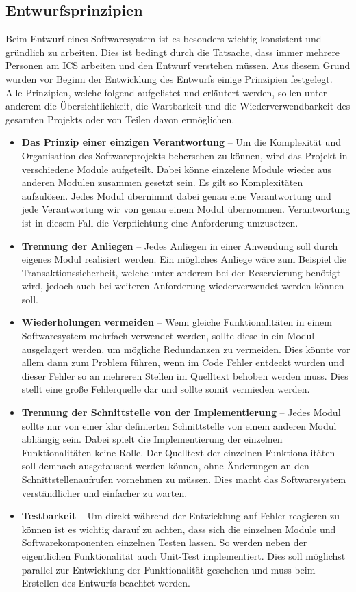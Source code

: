 		\subsection{Entwurfsprinzipien}
		Beim Entwurf eines Softwaresystem ist es besonders wichtig konsistent und gründlich zu arbeiten. Dies ist bedingt durch die Tatsache, dass immer mehrere Personen am \ac{ICS} arbeiten und den Entwurf verstehen müssen. Aus diesem Grund wurden vor Beginn der Entwicklung des Entwurfs einige Prinzipien festgelegt. Alle Prinzipien, welche folgend aufgelistet und erläutert werden, sollen unter anderem die Übersichtlichkeit, die Wartbarkeit und die Wiederverwendbarkeit des gesamten Projekts oder von Teilen davon ermöglichen.
		\begin{itemize}
			\item \textbf{Das Prinzip einer einzigen Verantwortung} -- Um die Komplexität und Organisation des Softwareprojekts beherschen zu können, wird das Projekt in verschiedene Module aufgeteilt. Dabei könne einzelene Module wieder aus anderen Modulen zusammen gesetzt sein. Es gilt so Komplexitäten aufzulösen. Jedes Modul übernimmt dabei genau eine Verantwortung und jede Verantwortung wir von genau einem Modul übernommen. Verantwortung ist in diesem Fall die Verpflichtung eine Anforderung umzusetzen. \autocite[Vgl.][]{Lahres.2015}
			\item \textbf{Trennung der Anliegen} -- Jedes Anliegen in einer Anwendung soll durch eigenes Modul realisiert werden. Ein mögliches Anliege wäre zum Beispiel die Transaktionssicherheit, welche unter anderem bei der Reservierung benötigt wird, jedoch auch bei weiteren Anforderung wiederverwendet werden können soll.\autocite[Vgl.][]{Lahres.2015} 
			\item \textbf{Wiederholungen vermeiden} -- Wenn gleiche Funktionalitäten in einem Softwaresystem mehrfach verwendet werden, sollte diese in ein Modul ausgelagert werden, um mögliche Redundanzen zu vermeiden. Dies könnte vor allem dann zum Problem führen, wenn im Code Fehler entdeckt wurden und dieser Fehler so an mehreren Stellen im Quelltext behoben werden muss. Dies stellt eine große Fehlerquelle dar und sollte somit vermieden werden.\autocite[Vgl.][]{Lahres.2015} 
			\item \textbf{Trennung der Schnittstelle von der Implementierung} -- Jedes Modul sollte nur von einer klar definierten Schnittstelle von einem anderen Modul abhängig sein. Dabei spielt die Implementierung der einzelnen Funktionalitäten keine Rolle. Der Quelltext der einzelnen Funktionalitäten soll demnach ausgetauscht werden können, ohne Änderungen an den Schnittstellenaufrufen vornehmen zu müssen. Dies macht das Softwaresystem verständlicher und einfacher zu warten.\autocite[Vgl.][]{Lahres.2015} 
			\item \textbf{Testbarkeit} -- Um direkt während der Entwicklung auf Fehler reagieren zu können ist es wichtig darauf zu achten, dass sich die einzelnen Module und Softwarekomponenten einzelnen Testen lassen. So werden neben der eigentlichen Funktionalität auch Unit-Test implementiert. Dies soll möglichst parallel zur Entwicklung der Funktionalität geschehen und muss beim Erstellen des Entwurfs beachtet werden.\autocite[Vgl.][]{Lahres.2015} 
		\end{itemize} 
		
